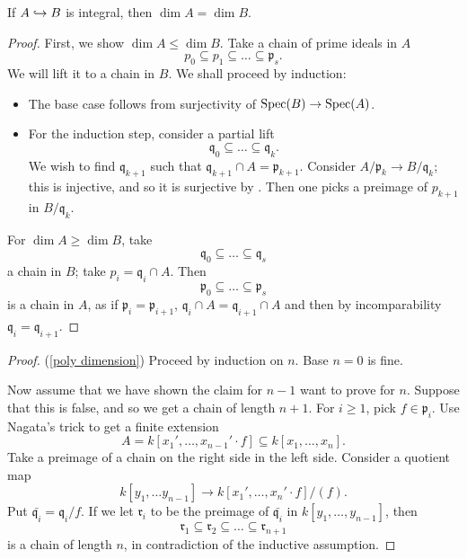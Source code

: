 \begin{prop}
  If $A \hookrightarrow B$ is integral, then $\dim A = \dim B$.
\end{prop}
\begin{proof}
  First, we show $\dim A \leq \dim B$.
  Take a chain of prime ideals in $A$
  \[ p_0 \subseteq p_1 \subseteq \dotso \subseteq \mathfrak p_s.\]
  We will lift it to a chain in $B$. We shall proceed by induction:
  \begin{itemize}
  \item The base case follows from surjectivity of $\text{Spec}(B) \to \text{Spec}(A)$.
  \item For the induction step, consider a partial lift
    \[ \mathfrak q_0 \subseteq \dotso \subseteq \mathfrak q_k.\]
    We wish to find $\mathfrak q_{k+1}$ such that $\mathfrak q_{k+1} \cap A = \mathfrak p_{k+1}$.
    Consider $A/{\mathfrak p_k} \to B/{\mathfrak q_k}$; this is injective, and so it is surjective by
    .
    Then one picks a preimage of $p_{k+1}$ in $B/{\mathfrak q_k}$.
  \end{itemize}
  For $\dim A \geq \dim B$, take
  \[ \mathfrak q_0 \subseteq \dotso \subseteq \mathfrak q_s\]
  a chain in $B$; take $p_i = \mathfrak q_i \cap A$. Then
  \[ \mathfrak p_0 \subseteq \dotso \subseteq \mathfrak p_s\]
  is a chain in $A$, as if $\mathfrak p_i = \mathfrak p_{i+1}$, $\mathfrak q_i \cap A = \mathfrak q_{i+1} \cap A$ and then by incomparability
  $\mathfrak q_i = \mathfrak q_{i+1}$.
\end{proof}

\begin{proof}(\cref{poly dimension})
  Proceed by induction on $n$. Base $n=0$ is fine.

  Now assume that we have shown the claim for $n-1$ want to prove for $n$. Suppose that this is false, and so we get a chain of length $n+1$. For $i \geq 1$, pick $f \in \mathfrak p_i$.
  Use Nagata's trick to get a finite extension
  \[ A = k[x_1', \dotsc, x_{n-1}' \cdot f] \subseteq k[x_1, \dotsc, x_n].\]
  Take a preimage of a chain on the right side in the left side.
  Consider a quotient map
  \[ k[y_1, \dotsc y_{n-1}] \to k[x_1', \dotsc, x_n' \cdot f]/{(f)}.\]
  Put $\bar{\mathfrak q_i} = \mathfrak q_i /{f}$.
  If we let $\mathfrak r_i$ to be the preimage of $\bar{\mathfrak q_i}$ in $k[y_1, \dotsc, y_{n-1}]$, then
  \[ \mathfrak r_1 \subseteq \mathfrak r_2 \subseteq \dotso \subseteq \mathfrak r_{n+1}\]
  is a chain of length $n$, in contradiction of the inductive assumption.
\end{proof}


